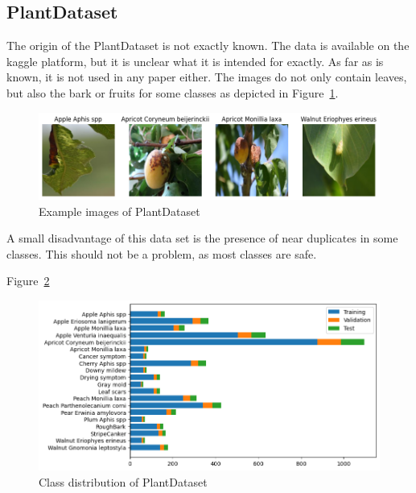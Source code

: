 \subsection{PlantDataset}
The origin of the PlantDataset is not exactly known. The data is available on the kaggle platform, but it is unclear what it is intended for exactly. As far as is known, it is not used in any paper either.
The images do not only contain leaves, but also the bark or fruits for some classes as depicted in Figure~\ref{fig:example_images_of_plantdataset}.
\begin{figure}[H]
    \begin{center}
    \includegraphics[width=15cm]{../../images/example_images_of_plantdataset.png}
    \caption{Example images of PlantDataset}\label{fig:example_images_of_plantdataset}
    \end{center}
\end{figure}
A small disadvantage of this data set is the presence of near duplicates in some classes. This should not be a problem, as most classes are safe.

Figure~\ref{fig:class_distribution_of_plantdataset}
\begin{figure}[H]
    \begin{center}
    \includegraphics[width=15cm]{../../images/class_distribution_of_plantdataset.png}
    \caption{Class distribution of PlantDataset}\label{fig:class_distribution_of_plantdataset}
    \end{center}
\end{figure}

